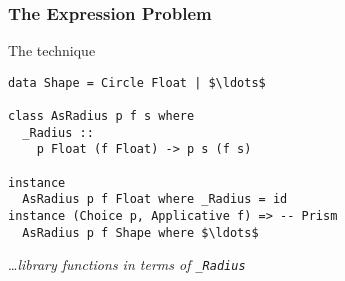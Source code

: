 \begin{frame}[fragile]
\frametitle{The Expression Problem}
\begin{block}{The technique}
\begin{lstlisting}[style=haskell,mathescape]
data Shape = Circle Float | $\ldots$

class AsRadius p f s where
  _Radius ::
    p Float (f Float) -> p s (f s)

instance
  AsRadius p f Float where _Radius = id
instance (Choice p, Applicative f) => -- Prism
  AsRadius p f Shape where $\ldots$
\end{lstlisting}
\ldots \emph{library functions in terms of \lstinline[style=haskell]{_Radius}}
\end{block}
\end{frame}
